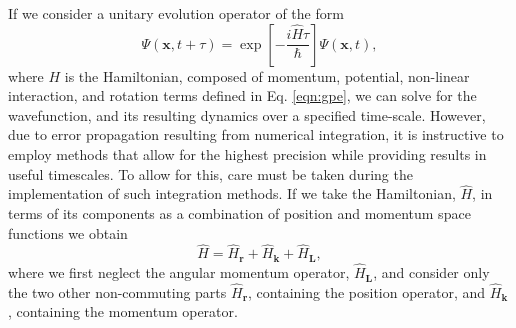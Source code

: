 If we consider a unitary evolution operator of the form
\begin{equation}\label{eqn:1}
\Psi(\mathbf{x},t+\tau) = \exp\left[ -\frac{i\hat{H}\tau}{\hbar}\right]\Psi(\mathbf{x},t),
\end{equation}
where $H$ is the Hamiltonian, composed of momentum, potential, non-linear interaction, and rotation terms defined in Eq. \eqref{eqn:gpe}, we can solve for the wavefunction, and its resulting dynamics over a specified time-scale. However, due to error propagation resulting from numerical integration, it is instructive to employ methods that allow for the highest precision while providing results in useful timescales. To allow for this, care must be taken during the implementation of such integration methods.  If we take the Hamiltonian, $\hat{H}$, in terms of its components as a combination of position and momentum space functions we obtain
\begin{equation}\label{eqn:2}
\hat{H} = \hat{H}_{\textbf{r}} + \hat{H}_{\textbf{k}} + \hat{H}_{\textbf{L}},
\end{equation}
where we first neglect the angular momentum operator, $\hat{H}_{\textbf{L}}$, and consider only the two other non-commuting parts $\hat{H}_{\textbf{r}}$, containing the position operator, and $\hat{H}_{\textbf{k}}$, containing the momentum operator.

